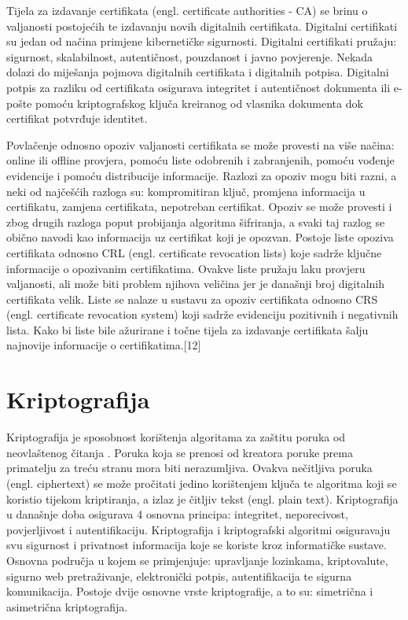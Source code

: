 \documentclass[]{foi}
\begin{document}
Tijela za izdavanje certifikata (engl. certificate authorities - CA) se brinu o valjanosti postojećih te izdavanju novih digitalnih certifikata.
Digitalni certifikati su jedan od načina primjene kibernetičke sigurnosti.
Digitalni certifikati pružaju: sigurnost, skalabilnost, autentičnost, pouzdanost i javno povjerenje.
Nekada dolazi do miješanja pojmova digitalnih certifikata i digitalnih potpisa.
Digitalni potpis za razliku od certifikata osigurava integritet i autentičnost dokumenta ili e-pošte pomoću kriptografskog ključa kreiranog od vlasnika dokumenta dok certifikat potvrđuje identitet.

Povlačenje odnosno opoziv valjanosti certifikata se može provesti na više načina: online ili offline provjera, pomoću liste odobrenih i zabranjenih, pomoću vođenje evidencije i pomoću distribucije informacije.
Razlozi za opoziv mogu biti razni, a neki od najčešćih razloga su: kompromitiran ključ, promjena informacija u certifikatu, zamjena certifikata, nepotreban certifikat.
Opoziv se može provesti i zbog drugih razloga poput probijanja algoritma šifriranja, a svaki taj razlog se obično navodi kao informacija uz certifikat koji je opozvan.
Postoje liste opoziva certifikata odnosno CRL (engl. certificate revocation lists) koje sadrže ključne informacije o opozivanim certifikatima.
Ovakve liste pružaju laku provjeru valjanosti, ali može biti problem njihova veličina jer je današnji broj digitalnih certifikata velik.
Liste se nalaze u sustavu za opoziv certifikata odnosno CRS (engl. certificate revocation system) koji sadrže evidenciju pozitivnih i negativnih lista.
Kako bi liste bile ažurirane i točne tijela za izdavanje certifikata šalju najnovije informacije o certifikatima.[12]

\chapter{Kriptografija}

Kriptografija je sposobnost korištenja algoritama za zaštitu poruka od neovlaštenog čitanja \cite{ibm-cryptography}.
Poruka koja se prenosi od kreatora poruke prema primatelju za treću stranu mora biti nerazumljiva.
Ovakva nečitljiva poruka (engl. ciphertext) se može pročitati jedino korištenjem ključa te algoritma koji se koristio tijekom kriptiranja, a izlaz je čitljiv tekst (engl. plain text).
Kriptografija u današnje doba osigurava 4 osnovna principa: integritet, neporecivost, povjerljivost i autentifikaciju.
Kriptografija i kriptografski algoritmi osiguravaju svu sigurnost i privatnost informacija koje se koriste kroz informatičke sustave.
Osnovna područja u kojem se primjenjuje: upravljanje lozinkama, kriptovalute, sigurno web pretraživanje, elektronički potpis, autentifikacija te sigurna komunikacija.
Postoje dvije osnovne vrste kriptografije, a to su: simetrična i asimetrična kriptografija.
\end{document}
